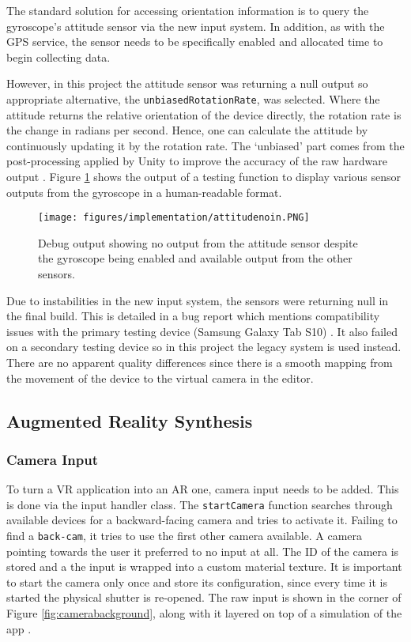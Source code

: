 \documentclass[12pt, a4paper]{article}
\begin{document}
The standard solution for accessing orientation information is to query the gyroscope's attitude sensor via the new input system. In addition, as with the GPS service, the sensor needs to be specifically enabled and allocated time to begin collecting data.  

However, in this project the attitude sensor was returning a null output so appropriate alternative, the \verb|unbiasedRotationRate|, was selected. Where the attitude returns the relative orientation of the device directly, the rotation rate is the change in radians per second. Hence, one can calculate the attitude by continuously updating it by the rotation rate. The `unbiased' part comes from the post-processing applied by Unity to improve the accuracy of the raw hardware output \cite{movement:rotationrate}. Figure \ref{fig:attitudezeros} shows the output of a testing function to display various sensor outputs from the gyroscope in a human-readable format.

\begin{figure}[h]
    \centering
    \texttt{[image: figures/implementation/attitudenoin.PNG]}
        \caption{Debug output showing no output from the attitude sensor despite the gyroscope being enabled and available output from the other sensors.}
        \label{fig:attitudezeros}
\end{figure}

Due to instabilities in the new input system, the sensors were returning null in the final build. This is detailed in a bug report which mentions compatibility issues with the primary testing device (Samsung Galaxy Tab S10) \cite{movement:gyroissue}. It also failed on a secondary testing device so in this project the legacy system is used instead. There are no apparent quality differences since there is a smooth mapping from the movement of the device to the virtual camera in the editor. 

\subsection{Augmented Reality Synthesis}
\label{augmentedrealitysynthesis}

\subsubsection{Camera Input}
To turn a VR application into an AR one, camera input needs to be added. This is done via the input handler class. The \verb|startCamera| function searches through available devices for a backward-facing camera and tries to activate it. Failing to find a \verb|back-cam|, it tries to use the first other camera available. A camera pointing towards the user it preferred to no input at all. The ID of the camera is stored and a the input is wrapped into a custom material texture. It is important to start the camera only once and store its configuration, since every time it is started the physical shutter is re-opened. The raw input is shown in the corner of Figure \ref{fig:camerabackground}, along with it layered on top of a simulation of the app \cite{arsynthesis:cameratutorial}. 
\end{document}
